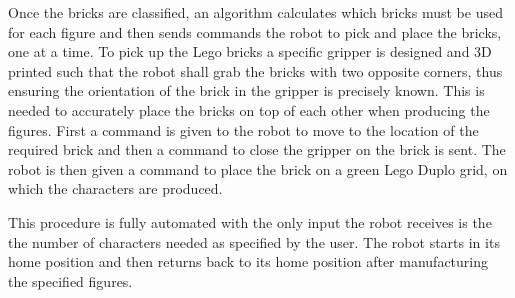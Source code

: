 Once the bricks are classified, an algorithm calculates which bricks must be used for each figure and then sends commands the robot to pick and place the bricks, one at a time. To pick up the Lego bricks a specific gripper is designed and 3D printed such that the robot shall grab the bricks with two opposite corners, thus ensuring the orientation of the brick in the gripper is precisely known. This is needed to accurately place the bricks on top of each other when producing the figures. First a command is given to the robot to move to the location of the required brick and then a command to close the gripper on the brick is sent. The robot is then given a command to place the brick on a green Lego Duplo grid, on which the characters are produced.

This procedure is fully automated with the only input the robot receives is the the number of characters needed as specified by the user. The robot starts in its home position and then returns back to its home position after manufacturing the specified figures.



